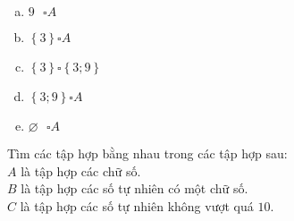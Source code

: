 \begin{bt}
\begin{multicols}{2}
\begin{enumerate}[a)]
\item $9 \text{ }\square A$
\item $\left\{3\right\} \square A$
\item $\left\{3\right\} \square \left\{3; 9\right\}$
\item $\left\{3; 9\right\} \square A$
\item $\varnothing \text{ } \square A$
\end{enumerate}
\end{multicols}
\end{bt}   \begin{bt}
Tìm các tập hợp bằng nhau trong các tập hợp sau:\\
$A$ là tập hợp các chữ số.\\
$B$ là tập hợp các số tự nhiên có một chữ số.\\
$C$ là tập hợp các số tự nhiên không vượt quá $10$.

\end{bt}
